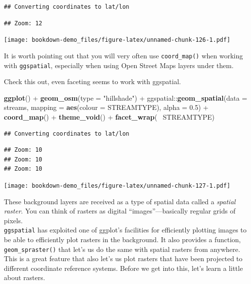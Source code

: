 \documentclass[]{book}
\newenvironment{Shaded}{\begin{snugshade}}{\end{snugshade}}
\newcommand{\KeywordTok}[1]{\textcolor[rgb]{0.13,0.29,0.53}{\textbf{{#1}}}}
\newcommand{\DataTypeTok}[1]{\textcolor[rgb]{0.13,0.29,0.53}{{#1}}}
\newcommand{\FloatTok}[1]{\textcolor[rgb]{0.00,0.00,0.81}{{#1}}}
\newcommand{\StringTok}[1]{\textcolor[rgb]{0.31,0.60,0.02}{{#1}}}
\newcommand{\NormalTok}[1]{{#1}}
\theoremstyle{definition}
\theoremstyle{definition}
\theoremstyle{remark}
\begin{document}
\begin{verbatim}
## Converting coordinates to lat/lon
\end{verbatim}

\begin{verbatim}
## Zoom: 12
\end{verbatim}

\texttt{[image: bookdown-demo\_files/figure-latex/unnamed-chunk-126-1.pdf]}

It is worth pointing out that you will very often use
\texttt{coord\_map()} when working with \texttt{ggspatial}, especially
when using Open Street Maps layers under them.

Check this out, even faceting seems to work with ggspatial.

\begin{Shaded}
\begin{Highlighting}[]
\KeywordTok{ggplot}\NormalTok{() +}
\StringTok{  }\KeywordTok{geom_osm}\NormalTok{(}\DataTypeTok{type =} \StringTok{"hillshade"}\NormalTok{) +}\StringTok{ }
\StringTok{  }\NormalTok{ggspatial::}\KeywordTok{geom_spatial}\NormalTok{(}\DataTypeTok{data =} \NormalTok{streams, }\DataTypeTok{mapping =} \KeywordTok{aes}\NormalTok{(}\DataTypeTok{colour =} \NormalTok{STREAMTYPE), }\DataTypeTok{alpha =} \FloatTok{0.5}\NormalTok{) +}
\StringTok{  }\KeywordTok{coord_map}\NormalTok{() +}
\StringTok{  }\KeywordTok{theme_void}\NormalTok{() +}
\StringTok{  }\KeywordTok{facet_wrap}\NormalTok{(~}\StringTok{ }\NormalTok{STREAMTYPE)}
\end{Highlighting}
\end{Shaded}

\begin{verbatim}
## Converting coordinates to lat/lon
\end{verbatim}

\begin{verbatim}
## Zoom: 10
## Zoom: 10
## Zoom: 10
\end{verbatim}

\texttt{[image: bookdown-demo\_files/figure-latex/unnamed-chunk-127-1.pdf]}

These background layers are received as a type of spatial data called a
\emph{spatial raster}. You can think of rasters as digital
``images''---basically regular grids of pixels.\\
\texttt{ggspatial} has exploited one of ggplot's facilities for
efficiently plotting images to be able to efficiently plot rasters in
the background. It also provides a function, \texttt{geom\_spraster()}
that let's us do the same with spatial rasters from anywhere. This is a
great feature that also let's us plot rasters that have been projected
to different coordinate reference systems. Before we get into this,
let's learn a little about rasters.
\end{document}
